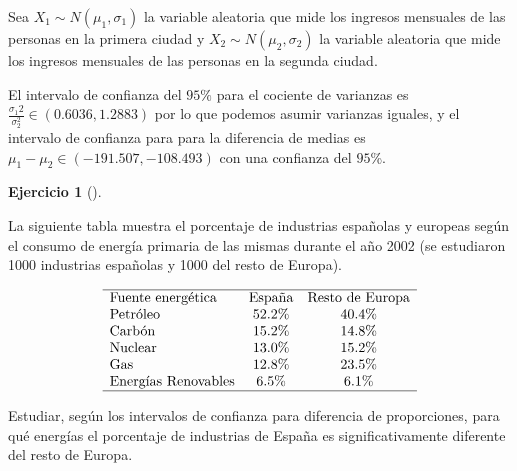 \documentclass[
  spanish,
  a4paper,
]{scrreport}
\theoremstyle{definition}
\newtheorem{exercise}{Ejercicio}[chapter]
\theoremstyle{remark}
\begin{document}
\begin{tcolorbox}[enhanced jigsaw, arc=.35mm, bottomrule=.15mm, bottomtitle=1mm, breakable, colback=white, colbacktitle=quarto-callout-tip-color!10!white, colframe=quarto-callout-tip-color-frame, coltitle=black, left=2mm, leftrule=.75mm, opacityback=0, opacitybacktitle=0.6, rightrule=.15mm, title=\textcolor{quarto-callout-tip-color}{\faLightbulb}\hspace{0.5em}{Solución}, titlerule=0mm, toprule=.15mm, toptitle=1mm]

Sea \(X_1\sim N(\mu_1, \sigma_1)\) la variable aleatoria que mide los
ingresos mensuales de las personas en la primera ciudad y
\(X_2\sim N(\mu_2, \sigma_2)\) la variable aleatoria que mide los
ingresos mensuales de las personas en la segunda ciudad.

El intervalo de confianza del \(95\%\) para el cociente de varianzas es
\(\frac{\sigma_1 2}{\sigma_2^2}\in (0.6036, 1.2883)\) por lo que podemos
asumir varianzas iguales, y el intervalo de confianza para para la
diferencia de medias es \(\mu_1-\mu_2\in (-191.507, -108.493)\) con una
confianza del \(95\)\%.

\end{tcolorbox}

\begin{exercise}[]\protect\hypertarget{exr-intervalo-confianza-comparación-proporciones-emisiones}{}\label{exr-intervalo-confianza-comparación-proporciones-emisiones}

La siguiente tabla muestra el porcentaje de industrias españolas y
europeas según el consumo de energía primaria de las mismas durante el
año 2002 (se estudiaron 1000 industrias españolas y 1000 del resto de
Europa).

\[
\begin{array}{lcc}
\hline
\mbox{Fuente energética}  &  \mbox{España}  & \mbox{Resto de Europa} \\
\mbox{Petróleo}            & 52.2\% &    40.4\%     \\
\mbox{Carbón}              & 15.2\% &    14.8\%     \\
\mbox{Nuclear}             & 13.0\% &    15.2\%     \\
\mbox{Gas}                 & 12.8\% &    23.5\%     \\
\mbox{Energías Renovables} & 6.5\%  &     6.1\%     \\
\hline
\end{array}
\]

Estudiar, según los intervalos de confianza para diferencia de
proporciones, para qué energías el porcentaje de industrias de España es
significativamente diferente del resto de Europa.

\end{exercise}
\end{document}
